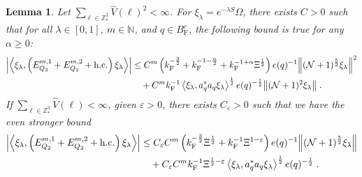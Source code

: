 \documentclass[12pt,a4paper]{article}
\numberwithin{equation}{section}
\newcommand{\NNN}{\mathbb{N}}
\newcommand{\1}{\mathbb{I}}
\newcommand{\F}{\mathrm{F}}
\newcommand{\Z}{\mathbb{Z}}
\newcommand{\NN}{\mathcal{N}}
\newcommand{\half}{\frac{1}{2}}
\newcommand{\eva}[1]{\left\langle #1 \right\rangle}
\theoremstyle{plain}
\newtheorem{lemma}[theorem]{Lemma}
\theoremstyle{definition}
\theoremstyle{remark}
\theoremstyle{plain}
\theoremstyle{definition}
\theoremstyle{remark}
\begin{document}
\begin{lemma} \label{lem:EQ211}
Let $ \sum_{\ell \in \Z^3_*} \hat{V}(\ell)^2 < \infty $. For $\xi_\lambda = e^{-\lambda S} \Omega$, there exists $ C > 0 $ such that for all $ \lambda \in [0,1] $, $ m \in \NNN $, and $ q \in B_{\F}^c $, the following bound is true for any $ \alpha \ge 0 $:
\begin{align}
	\abs{\eva{\xi_\lambda,\left(E^{m,1}_{Q_2}+E^{m,2}_{Q_2}+\mathrm{h.c.}\right) \xi_\lambda }}
	&\leq C^m \left( k_{\F}^{-\frac 32}
		+ k_{\F}^{-1-\frac{\alpha}{2}} 
		+ k_{\F}^{-1+\alpha} \Xi^{\half} \right) e(q)^{-1}
		\norm{ (\NN+1)^{\frac 52} \xi_\lambda }^2 \nonumber\\
	&\quad + C^m k_{\F}^{-1} \eva{\xi_\lambda, a_q^* a_q \xi_\lambda}^{\half} e(q)^{-\half} \norm{ (\NN+1)^2 \xi_\lambda } \;. \label{eq:estEQ211_Coulomb}
\end{align}
If $ \sum_{\ell \in \Z^3_*} \hat{V}(\ell) < \infty $, given $ \varepsilon > 0 $, there exists $ C_\varepsilon > 0 $ such that we have the even stronger bound
\begin{align}
	\abs{\eva{\xi_\lambda,\left(E^{m,1}_{Q_2}+E^{m,2}_{Q_2}+\mathrm{h.c.}\right) \xi_\lambda }}
	&\leq C_\varepsilon C^m \left( k_{\F}^{-\frac{3}{2}} \Xi^\half 
		+ k_{\F}^{-1}\Xi^{1-\varepsilon} \right) e(q)^{-1} 
		\norm { (\NN+1)^{\frac 52} \xi_\lambda } \nonumber\\
	&\quad + C_\varepsilon C^m k_{\F}^{-1} \Xi^{\half - \varepsilon} \eva{\xi_\lambda, a_q^* a_q \xi_\lambda}^{\half} e(q)^{-\half} \;. \label{eq:estEQ211}
\end{align}
\end{lemma}
\end{document}
